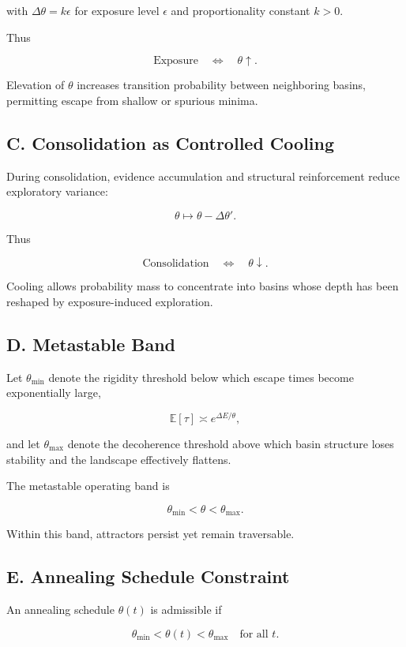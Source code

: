 \documentclass[11pt]{article}
\theoremstyle{remark}
\begin{document}
with $\Delta\theta = k \epsilon$ for exposure level $\epsilon$ and proportionality constant $k > 0$.

Thus

\[
\text{Exposure}
\quad \Longleftrightarrow \quad
\theta \uparrow.
\]

Elevation of $\theta$ increases transition probability between neighboring basins, permitting escape from shallow or spurious minima.

\subsection*{C. Consolidation as Controlled Cooling}

During consolidation, evidence accumulation and structural reinforcement reduce exploratory variance:

\[
\theta \mapsto \theta - \Delta\theta'.
\]

Thus

\[
\text{Consolidation}
\quad \Longleftrightarrow \quad
\theta \downarrow.
\]

Cooling allows probability mass to concentrate into basins whose depth has been reshaped by exposure-induced exploration.

\subsection*{D. Metastable Band}

Let $\theta_{\min}$ denote the rigidity threshold below which escape times become exponentially large,

\[
\mathbb{E}[\tau] \asymp e^{\Delta E / \theta},
\]

and let $\theta_{\max}$ denote the decoherence threshold above which basin structure loses stability and the landscape effectively flattens.

The metastable operating band is

\[
\theta_{\min} < \theta < \theta_{\max}.
\]

Within this band, attractors persist yet remain traversable.

\subsection*{E. Annealing Schedule Constraint}

An annealing schedule $\theta(t)$ is admissible if

\[
\theta_{\min} < \theta(t) < \theta_{\max}
\quad \text{for all } t.
\]
\end{document}
